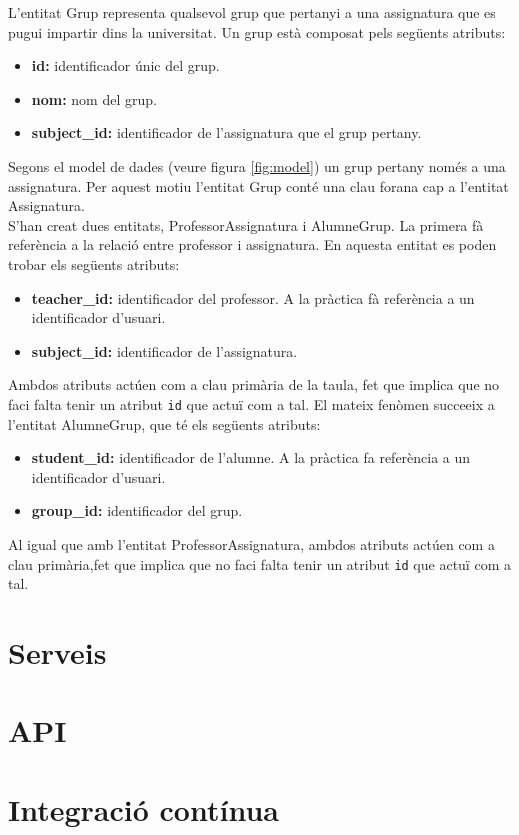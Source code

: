    	L'entitat Grup representa qualsevol grup que pertanyi a una assignatura que es pugui impartir dins la universitat. Un grup està composat pels següents atributs:
   	
   	\begin{itemize}
   		\item \textbf{id:} identificador únic del grup.
   		\item \textbf{nom:} nom del grup.
   		\item \textbf{subject\_id:} identificador de l'assignatura que el grup pertany. 
   	\end{itemize}
   	
   	Segons el model de dades (veure figura \ref{fig:model}) un grup pertany només a una assignatura. Per aquest motiu l'entitat Grup conté una clau forana cap a l'entitat Assignatura.\\
   	
   	S'han creat dues entitats, ProfessorAssignatura i AlumneGrup. La primera fà referència a la relació entre professor i assignatura. En aquesta entitat es poden trobar els següents atributs:
   	
   	\begin{itemize}
   		\item \textbf{teacher\_id:} identificador del professor. A la pràctica fà referència a un identificador d'usuari.
   		\item \textbf{subject\_id:} identificador de l'assignatura.
   	\end{itemize}
   	
   	Ambdos atributs actúen com a clau primària de la taula, fet que implica que no faci falta tenir  un atribut \texttt{id} que actuï com a tal. El mateix fenòmen succeeix a l'entitat AlumneGrup, que té els següents atributs:
   	
   	\begin{itemize}
   		\item \textbf{student\_id:} identificador de l'alumne. A la pràctica fa referència a un identificador d'usuari.
   		\item \textbf{group\_id:} identificador del grup.
   	\end{itemize}
   	
   Al igual que amb l'entitat ProfessorAssignatura, ambdos atributs actúen com a clau primària,fet que implica que no faci falta tenir un atribut \texttt{id} que actuï com a tal.

\section{Serveis}

\section{\ac{API}}
	
\section{Integració contínua}


